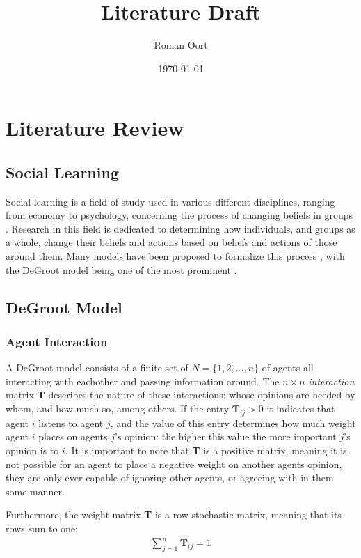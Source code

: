 \documentclass{article}
\title{Literature Draft}
\author{Roman Oort}
\date{\today}
\begin{document}
\maketitle

\tableofcontents

\newpage

\section{Literature Review}
\subsection{Social Learning}
Social learning is a field of study used in various different disciplines, ranging from economy to psychology, concerning the process of changing beliefs in groups \cite{reed2010sociallearning}. Research in this field is dedicated to determining how individuals, and groups as a whole, change their beliefs and actions based on beliefs and actions of those around them. Many models have been proposed to formalize this process \cite{golub2017learning}, with the DeGroot model being one of the most prominent \cite{degroot1974concensus}.

\subsection{DeGroot Model}
\subsubsection{Agent Interaction}
A DeGroot model consists of a finite set of $N=\{1, 2, ..., n\}$ of agents all interacting with eachother and passing information around. The $n \times n$ \emph{interaction} matrix \textbf{T} describes the nature of these interactions: whose opinions are heeded by whom, and how much so, among others. If the entry $\textbf{T}_{ij} > 0$ it indicates that agent $i$ listens to agent $j$, and the value of this entry determines how much weight agent $i$ places on agents $j$'s opinion: the higher this value the more important $j$'s opinion is to $i$. It is important to note that \textbf{T} is a positive matrix, meaning it is not possible for an agent to place a negative weight on another agents opinion, they are only ever capable of ignoring other agents, or agreeing with in them some manner. 

Furthermore, the weight matrix \textbf{T} is a row-stochastic matrix, meaning that its rows sum to one:
\begin{align*}
    \sum_{j=1}^{n} \textbf{T}_{ij} = 1
\end{align*}
\end{document}
